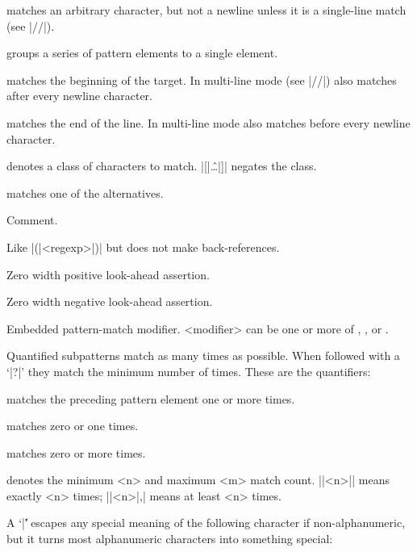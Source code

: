 \documentclass{refbase}
\begin{document}
\begin{enum}{1cm}

matches an arbitrary character, but not a newline unless it is a
single-line match (see |//|).

\Xj{|(|\ldots|)|}
groups a series of pattern elements to a single element.

\Xj{\^}
matches the beginning of the target. In multi-line mode (see
|//|) also matches after every newline character.

\Xj{\$}
matches the end of the line.
In multi-line mode also matches before every newline character.

denotes a class of characters to match. |[|\^\ldots|]| negates the class.

\Xj{|(|\ldots\|\ldots\|\ldots|)|}
matches one of the alternatives.

Comment.

Like |(|<regexp>|)| but does not make back-references.

Zero width positive look-ahead assertion.

Zero width negative look-ahead assertion.

Embedded pattern-match modifier. <modifier> can be one or more of
, ,  or .

\end{enum}

\xtraspace
Quantified subpatterns match as many times as possible. 
When followed with a `|?|' they match the minimum number of times.
These are the quantifiers:

\begin{enum}{1cm}

\Xj{|+|}
matches the preceding pattern element one or more times.

matches zero or one times.

\Xj{|*|}
matches zero or more times.

denotes the minimum <n> and maximum <m> match count. |{|<n>|}| means
exactly <n> times; |{|<n>|,}| means at least <n> times. 

\end{enum}

\xtraspace
A `|\|' escapes any special meaning of the following character
if non-alphanumeric, but it turns most alphanumeric characters
into something special:
\end{document}

